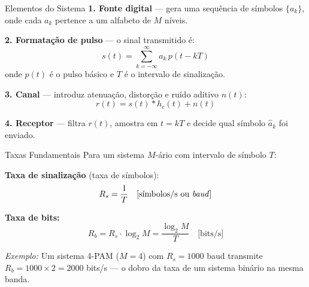 
\begin{frame}{Elementos do Sistema}
  \textbf{1. Fonte digital} — gera uma sequência de símbolos $\{a_k\}$,
  onde cada $a_k$ pertence a um alfabeto de $M$ níveis.

  \vspace{0.3cm}
  \textbf{2. Formatação de pulso} — o sinal transmitido é:
  \[
    s(t) = \sum_{k=-\infty}^{\infty} a_k\, p(t - kT)
  \]
  onde $p(t)$ é o \alert{pulso básico} e $T$ é o \alert{intervalo de sinalização}.

  \vspace{0.3cm}
  \textbf{3. Canal} — introduz atenuação, distorção e ruído aditivo $n(t)$:
  \[
    r(t) = s(t) * h_c(t) + n(t)
  \]

  \vspace{0.3cm}
  \textbf{4. Receptor} — filtra $r(t)$, amostra em $t = kT$ e decide
  qual símbolo $\hat{a}_k$ foi enviado.
\end{frame}


\begin{frame}{Taxas Fundamentais}
  Para um sistema $M$-ário com intervalo de símbolo $T$:

  \vspace{0.3cm}
  \textbf{Taxa de sinalização} (taxa de símbolos):
  \[
    R_s = \frac{1}{T} \quad \text{[símbolos/s ou \textit{baud}]}
  \]

  \vspace{0.3cm}
  \textbf{Taxa de bits:}
  \[
    R_b = R_s \cdot \log_2 M = \frac{\log_2 M}{T} \quad \text{[bits/s]}
  \]

  \vspace{0.3cm}
  \textit{Exemplo:} Um sistema 4-PAM ($M=4$) com $R_s = 1000$ baud
  transmite $R_b = 1000 \times 2 = 2000$ bits/s — o \alert{dobro}
  da taxa de um sistema binário na mesma banda.
\end{frame}
